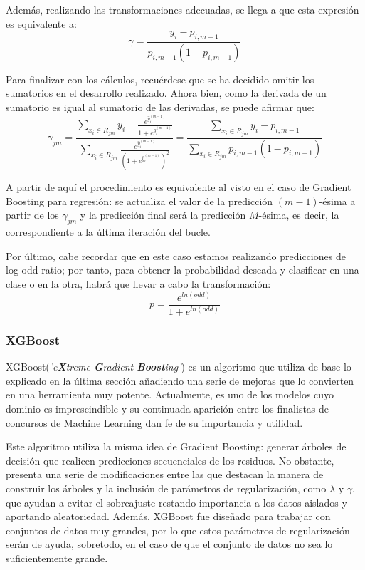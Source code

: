 \documentclass[12pt,twoside]{article}
\begin{document}
Además, realizando las transformaciones adecuadas, se llega a que esta expresión es equivalente a:
\begin{equation}
\label{eqn:4}
\gamma = \frac{y_i - p_{i, m-1}}{p_{i, m-1}(1 - p_{i, m-1})}
\end{equation}

Para finalizar con los cálculos, recuérdese que se ha decidido omitir los sumatorios en el desarrollo realizado. Ahora bien, como la derivada de un sumatorio es igual al sumatorio de las derivadas, se puede afirmar que:
\begin{equation*}
\gamma_{jm} = \frac{\displaystyle \sum_{x_i \in R_{jm}} y_i - \frac{e^{\hat{y}_i^{(m-1)}}}{1 + e^{\hat{y}_i^{(m-1)}}}}{\displaystyle \sum_{x_i \in R_{jm}} \frac{e^{\hat{y}_i^{(m-1)}}}{(1 + e^{\hat{y}_i^{(m-1)}})^2}} = \frac{\displaystyle \sum_{x_i \in R_{jm}} y_i - p_{i, m-1}}{\displaystyle \sum_{x_i \in R_{jm}} p_{i, m-1}(1 - p_{i, m-1})}
\end{equation*}

A partir de aquí el procedimiento es equivalente al visto en el caso de Gradient Boosting para regresión: se actualiza el valor de la predicción $(m-1)$-ésima a partir de los $\gamma_{jm}$ y la predicción final será la predicción $M$-ésima, es decir, la correspondiente a la última iteración del bucle.

Por último, cabe recordar que en este caso estamos realizando predicciones de log-odd-ratio; por tanto, para obtener la probabilidad deseada y clasificar en una clase o en la otra, habrá que llevar a cabo la transformación:
\begin{equation*}
p = \frac{e^{ln(odd)}}{1 + e^{ln(odd)}}
\end{equation*}





\subsubsection{XGBoost} \label{sec:XGBoost}
XGBoost(\textit{'e\textbf{X}treme \textbf{G}radient \textbf{Boost}ing'}) \cite{CH01} es un algoritmo que utiliza de base lo explicado en la última sección añadiendo una serie de mejoras que lo convierten en una herramienta muy potente. Actualmente, es uno de los modelos cuyo dominio es imprescindible y su continuada aparición entre los finalistas de concursos de Machine Learning dan fe de su importancia y utilidad.

Este algoritmo utiliza la misma idea de Gradient Boosting: generar árboles de decisión que realicen predicciones secuenciales de los residuos. No obstante, presenta una serie de modificaciones entre las que destacan la manera de construir los árboles y la inclusión de parámetros de regularización, como $\lambda$ y $\gamma$, que ayudan a evitar el sobreajuste restando importancia a los datos aislados y aportando aleatoriedad. Además, XGBoost fue diseñado para trabajar con conjuntos de datos muy grandes, por lo que estos parámetros de regularización serán de ayuda, sobretodo, en el caso de que el conjunto de datos no sea lo suficientemente grande.
\end{document}
